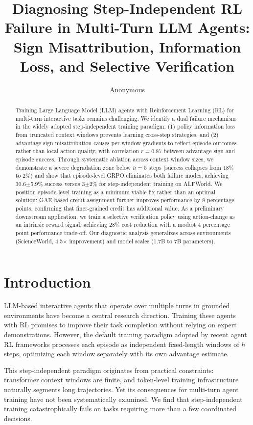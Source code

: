 \documentclass[11pt]{article}
\title{Diagnosing Step-Independent RL Failure in Multi-Turn LLM Agents:\\Sign Misattribution, Information Loss, and Selective Verification}
\author{Anonymous}
\date{}
\begin{document}
\maketitle

\begin{abstract}
Training Large Language Model (LLM) agents with Reinforcement Learning (RL) for multi-turn interactive tasks remains challenging. We identify a dual failure mechanism in the widely adopted step-independent training paradigm: (1) policy information loss from truncated context windows prevents learning cross-step strategies, and (2) advantage sign misattribution causes per-window gradients to reflect episode outcomes rather than local action quality, with correlation $r=0.87$ between advantage sign and episode success. Through systematic ablation across context window sizes, we demonstrate a severe degradation zone below $h=5$ steps (success collapses from 18\% to 2\%) and show that episode-level GRPO eliminates both failure modes, achieving 30.6$\pm$5.9\% success versus 3$\pm$2\% for step-independent training on ALFWorld. We position episode-level training as a minimum viable fix rather than an optimal solution: GAE-based credit assignment further improves performance by 8 percentage points, confirming that finer-grained credit has additional value. As a preliminary downstream application, we train a selective verification policy using action-change as an intrinsic reward signal, achieving 28\% cost reduction with a modest 4 percentage point performance trade-off. Our diagnostic analysis generalizes across environments (ScienceWorld, 4.5$\times$ improvement) and model scales (1.7B to 7B parameters).
\end{abstract}

\section{Introduction}

LLM-based interactive agents that operate over multiple turns in grounded environments have become a central research direction. Training these agents with RL promises to improve their task completion without relying on expert demonstrations. However, the default training paradigm adopted by recent agent RL frameworks processes each episode as independent fixed-length windows of $h$ steps, optimizing each window separately with its own advantage estimate.

This step-independent paradigm originates from practical constraints: transformer context windows are finite, and token-level training infrastructure naturally segments long trajectories. Yet its consequences for multi-turn agent training have not been systematically examined. We find that step-independent training catastrophically fails on tasks requiring more than a few coordinated decisions.
\end{document}
